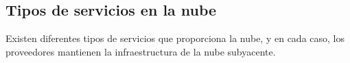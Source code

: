 \subsection{Tipos de servicios en la nube}
Existen diferentes tipos de servicios que proporciona la nube, y en cada caso, los proveedores mantienen la infraestructura de la nube subyacente.
    
    
    